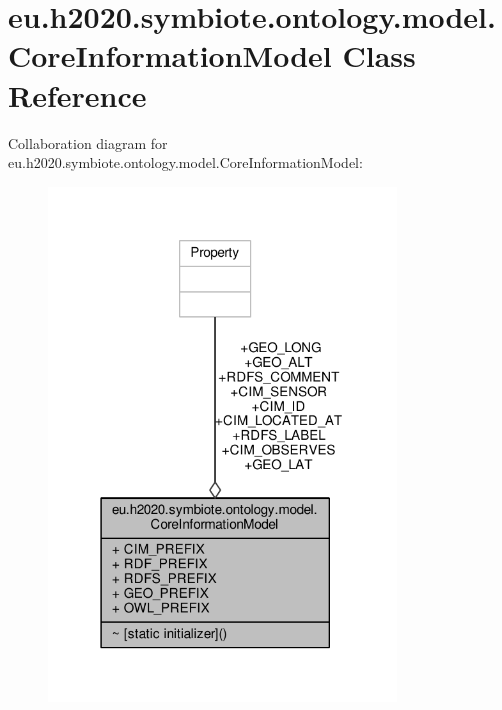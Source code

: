 \hypertarget{classeu_1_1h2020_1_1symbiote_1_1ontology_1_1model_1_1CoreInformationModel}{}\section{eu.\+h2020.\+symbiote.\+ontology.\+model.\+Core\+Information\+Model Class Reference}
\label{classeu_1_1h2020_1_1symbiote_1_1ontology_1_1model_1_1CoreInformationModel}


Collaboration diagram for eu.\+h2020.\+symbiote.\+ontology.\+model.\+Core\+Information\+Model\+:
\nopagebreak
\begin{figure}[H]
\begin{center}
\leavevmode
\includegraphics[width=262pt]{classeu_1_1h2020_1_1symbiote_1_1ontology_1_1model_1_1CoreInformationModel__coll__graph}
\end{center}
\end{figure}
